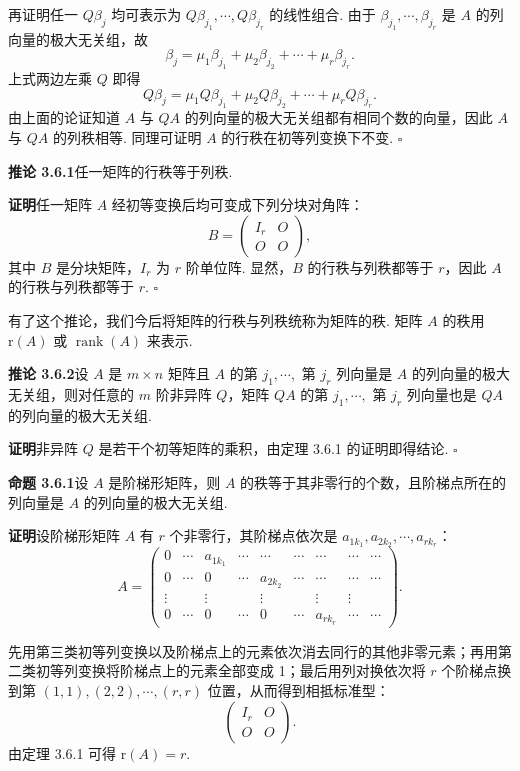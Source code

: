 \documentclass[UTF8, 12pt, fontset=fandol, oneside]{ctexart}
\begin{document}
再证明任一 $Q\beta_j$ 均可表示为 $Q\beta_{j_1},\cdots,Q\beta_{j_r}$ 的线性组合. 由于 $\beta_{j_1},\cdots,\beta_{j_r}$ 是 $A$ 的列向量的极大无关组，故
\[
\beta_j=\mu_1\beta_{j_1}+\mu_2\beta_{j_2}+\cdots+\mu_r\beta_{j_r}.
\]
上式两边左乘 $Q$ 即得
\[
Q\beta_j=\mu_1Q\beta_{j_1}+\mu_2Q\beta_{j_2}+\cdots+\mu_rQ\beta_{j_r}.
\]
由上面的论证知道 $A$ 与 $QA$ 的列向量的极大无关组都有相同个数的向量，因此 $A$ 与 $QA$ 的列秩相等. 同理可证明 $A$ 的行秩在初等列变换下不变. $\square$

\noindent\textbf{推论 3.6.1}\quad 任一矩阵的行秩等于列秩.

\noindent\textbf{证明}\quad 任一矩阵 $A$ 经初等变换后均可变成下列分块对角阵：
\[
B=\left(\begin{array}{cc}
I_r&O\\
O&O
\end{array}\right),
\]
其中 $B$ 是分块矩阵，$I_r$ 为 $r$ 阶单位阵. 显然，$B$ 的行秩与列秩都等于 $r$，因此 $A$ 的行秩与列秩都等于 $r$. $\square$

有了这个推论，我们今后将矩阵的行秩与列秩统称为矩阵的秩. 矩阵 $A$ 的秩用 $\mathrm{r}(A)$ 或 $\operatorname{rank}(A)$ 来表示.

\noindent\textbf{推论 3.6.2}\quad 设 $A$ 是 $m\times n$ 矩阵且 $A$ 的第 $j_1,\cdots,$ 第 $j_r$ 列向量是 $A$ 的列向量的极大无关组，则对任意的 $m$ 阶非异阵 $Q$，矩阵 $QA$ 的第 $j_1,\cdots,$ 第 $j_r$ 列向量也是 $QA$ 的列向量的极大无关组.

\noindent\textbf{证明}\quad 非异阵 $Q$ 是若干个初等矩阵的乘积，由定理 3.6.1 的证明即得结论. $\square$

\noindent\textbf{命题 3.6.1}\quad 设 $A$ 是阶梯形矩阵，则 $A$ 的秩等于其非零行的个数，且阶梯点所在的列向量是 $A$ 的列向量的极大无关组.

\noindent\textbf{证明}\quad 设阶梯形矩阵 $A$ 有 $r$ 个非零行，其阶梯点依次是 $a_{1k_1},a_{2k_2},\cdots,a_{rk_r}$：
\[
A=\left(\begin{array}{ccccccccc}
0&\cdots&a_{1k_1}&\cdots&\cdots&\cdots&\cdots&\cdots&\cdots\\
0&\cdots&0&\cdots&a_{2k_2}&\cdots&\cdots&\cdots&\cdots\\
\vdots&&\vdots&&\vdots&&\vdots&\vdots&\\
0&\cdots&0&\cdots&0&\cdots&a_{rk_r}&\cdots&\cdots
\end{array}\right).
\]

先用第三类初等列变换以及阶梯点上的元素依次消去同行的其他非零元素；再用第二类初等列变换将阶梯点上的元素全部变成 1；最后用列对换依次将 $r$ 个阶梯点换到第 $(1,1),(2,2),\cdots,(r,r)$ 位置，从而得到相抵标准型：
\[
\left(\begin{array}{cc}
I_r&O\\
O&O
\end{array}\right).
\]
由定理 3.6.1 可得 $\mathrm{r}(A)=r$.
\end{document}
